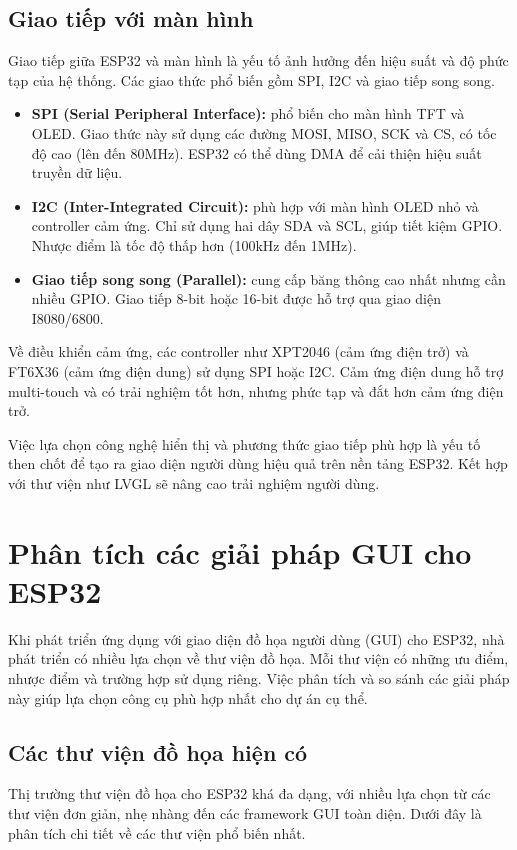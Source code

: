 \subsection{Giao tiếp với màn hình}
Giao tiếp giữa ESP32 và màn hình là yếu tố ảnh hưởng đến hiệu suất và độ phức tạp của hệ thống. Các giao thức phổ biến gồm SPI, I2C và giao tiếp song song.

\begin{itemize}
  \item \textbf{SPI (Serial Peripheral Interface):} phổ biến cho màn hình TFT và OLED. Giao thức này sử dụng các đường MOSI, MISO, SCK và CS, có tốc độ cao (lên đến 80MHz). ESP32 có thể dùng DMA để cải thiện hiệu suất truyền dữ liệu.
  
  \item \textbf{I2C (Inter-Integrated Circuit):} phù hợp với màn hình OLED nhỏ và controller cảm ứng. Chỉ sử dụng hai dây SDA và SCL, giúp tiết kiệm GPIO. Nhược điểm là tốc độ thấp hơn (100kHz đến 1MHz).
  
  \item \textbf{Giao tiếp song song (Parallel):} cung cấp băng thông cao nhất nhưng cần nhiều GPIO. Giao tiếp 8-bit hoặc 16-bit được hỗ trợ qua giao diện I8080/6800.
\end{itemize}

Về điều khiển cảm ứng, các controller như XPT2046 (cảm ứng điện trở) và FT6X36 (cảm ứng điện dung) sử dụng SPI hoặc I2C. Cảm ứng điện dung hỗ trợ multi-touch và có trải nghiệm tốt hơn, nhưng phức tạp và đắt hơn cảm ứng điện trở.

Việc lựa chọn công nghệ hiển thị và phương thức giao tiếp phù hợp là yếu tố then chốt để tạo ra giao diện người dùng hiệu quả trên nền tảng ESP32. Kết hợp với thư viện như LVGL sẽ nâng cao trải nghiệm người dùng.

\section{Phân tích các giải pháp GUI cho ESP32}
\tab Khi phát triển ứng dụng với giao diện đồ họa người dùng (GUI) cho ESP32, nhà phát triển có nhiều lựa chọn về thư viện đồ họa. Mỗi thư viện có những ưu điểm, nhược điểm và trường hợp sử dụng riêng. Việc phân tích và so sánh các giải pháp này giúp lựa chọn công cụ phù hợp nhất cho dự án cụ thể.
\subsection{Các thư viện đồ họa hiện có}
\tab Thị trường thư viện đồ họa cho ESP32 khá đa dạng, với nhiều lựa chọn từ các thư viện đơn giản, nhẹ nhàng đến các framework GUI toàn diện. Dưới đây là phân tích chi tiết về các thư viện phổ biến nhất.
